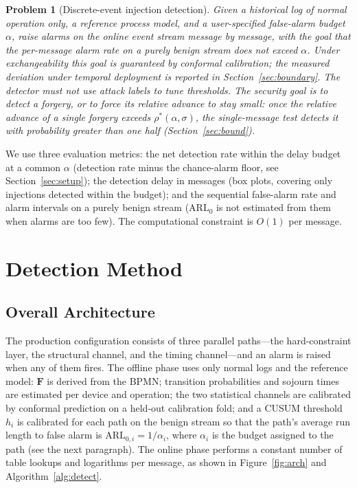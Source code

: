 \documentclass[manuscript,screen,review]{acmart}
\newtheorem{problem}{Problem}
\begin{document}
\begin{problem}[Discrete-event injection detection]
\label{prob:detect}
Given a historical log of normal operation only, a reference process model, and a user-specified false-alarm budget $\alpha$, raise alarms on the online event stream message by message, with the goal that the per-message alarm rate on a purely benign stream does not exceed $\alpha$. Under exchangeability this goal is guaranteed by conformal calibration; the measured deviation under temporal deployment is reported in Section~\ref{sec:boundary}. The detector must not use attack labels to tune thresholds. The security goal is \emph{to detect a forgery, or to force its relative advance to stay small}: once the relative advance of a single forgery exceeds $\rho^*(\alpha,\sigma)$, the single-message test detects it with probability greater than one half (Section~\ref{sec:bound}).
\end{problem}

We use three evaluation metrics: the net detection rate within the delay budget at a common $\alpha$ (detection rate minus the chance-alarm floor, see Section~\ref{sec:setup}); the detection delay in messages (box plots, covering only injections detected within the budget); and the sequential false-alarm rate and alarm intervals on a purely benign stream ($\mathrm{ARL}_0$ is not estimated from them when alarms are too few). The computational constraint is $O(1)$ per message.

\section{Detection Method}
\label{sec:framework}

\subsection{Overall Architecture}
\label{sec:arch}

The production configuration consists of three parallel paths---the hard-constraint layer, the structural channel, and the timing channel---and an alarm is raised when any of them fires. The offline phase uses only normal logs and the reference model: $\mathbf F$ is derived from the {BPMN}; transition probabilities and sojourn times are estimated per device and operation; the two statistical channels are calibrated by conformal prediction on a held-out calibration fold; and a {CUSUM} threshold $h_i$ is calibrated for each path on the benign stream so that the path's average run length to false alarm is $\mathrm{ARL}_{0,i}=1/\alpha_i$, where $\alpha_i$ is the budget assigned to the path (see the next paragraph). The online phase performs a constant number of table lookups and logarithms per message, as shown in Figure~\ref{fig:arch} and Algorithm~\ref{alg:detect}.
\end{document}
